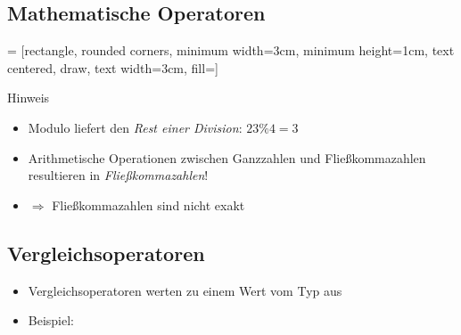 \subsection{Mathematische Operatoren}
\begin{frame}
    \slidehead
    \vspace{-0.2cm}
     = [rectangle, rounded corners, minimum width=3cm, minimum height=1cm, text centered, draw, text width=3cm, fill=]
    \vspace{0.05cm}
    \centering
    \pause
    \vspace{-0.1cm}
    \begin{block}{Hinweis}
        \begin{itemize}
            \item Modulo liefert den \textit{Rest einer Division}: $23 \% 4 = 3$
            \item Arithmetische Operationen zwischen Ganzzahlen und Fließkommazahlen resultieren in \textit{Fließkommazahlen}!  %

                \pause
            \item {} \pause {} $\Rightarrow$ Fließkommazahlen sind nicht exakt
        \end{itemize}
    \end{block}
\end{frame}


\subsection{Vergleichsoperatoren}
\begin{frame}
    \slidehead

    \begin{itemize}
        \item Vergleichsoperatoren werten zu einem Wert vom Typ  aus
        \item Beispiel:
    \end{itemize}
\end{frame}


